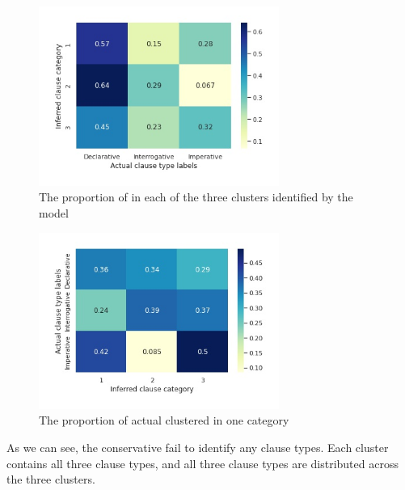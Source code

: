 \begin{figure}[H]
    \centering
    \includegraphics[width=0.7\textwidth]{figures/man-baseline-conservative-heat.jpg}
    \caption{The proportion of \diis{} in each of the three clusters identified by the \dlearnerabbr{} model}
    \label{fig:man-baseline-conservative-heat}
\end{figure}


\begin{figure}[H]
    \centering
    \includegraphics[width=0.7\textwidth]{figures/man-baseline-conservative-heatrev.jpg}
    \caption{The proportion of actual \diis{} clustered in one category}
    \label{fig:man-baseline-conservative-heatrev}
\end{figure}

As we can see, the conservative \dlearnerabbr{} fail to identify any clause types. Each cluster contains all three clause types, and all three clause types are distributed across the three clusters. 

